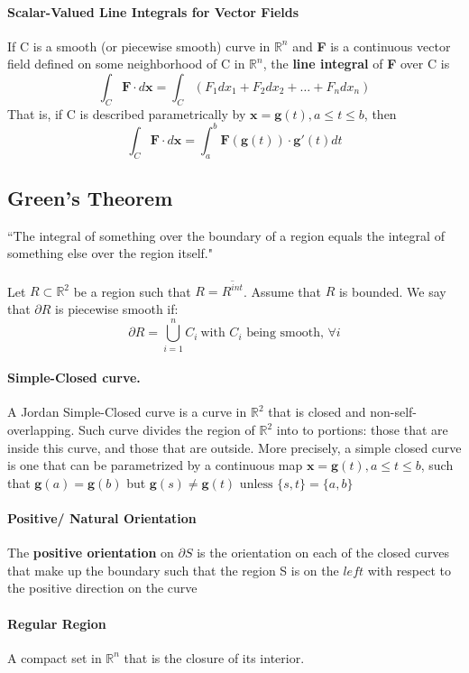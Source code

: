 \documentclass[11pt]{article}
\newcommand{\tb}[1]{\textbf{#1}}
\newcommand{\real}[0]{\mathbb{R}}
\newcommand{\vx}[0]{\tb{x}}
\begin{document}
\paragraph{Scalar-Valued Line Integrals for Vector Fields} If C is a smooth (or piecewise smooth) curve in $\real^n$ and \tb{F} is a continuous vector field defined on some neighborhood of C in $\real^n$, the \tb{line integral} of \tb{F} over C is
$$\int_C \tb{F} \cdot d\vx = \int_C (F_1dx_1+F_2dx_2+\hdots+F_ndx_n)$$
That is, if C is described parametrically by $\vx = \tb{g}(t), a\leq t\leq b$, then
$$\int_C \tb{F} \cdot d\vx = \int_a^b\tb{F}(\tb{g}(t))\cdot \tb{g}'(t)dt$$


\subsection{Green's Theorem} 
``The integral of something over the boundary of a region equals the integral of something else over the region itself."\\\\
Let $R\subset \real^2$ be a region such that $R = \overline{R^{int}}$. Assume that $R$ is bounded. We say that $\partial R$ is piecewise smooth if:
\begin{equation*}
    \partial R = \bigcup_{i = 1}^n C_i~\text{with $C_i$ being smooth, $\forall i$}
\end{equation*}

\paragraph{Simple-Closed curve.}
A Jordan Simple-Closed curve is a curve in $\real^2$ that is closed and non-self-overlapping. Such curve divides the region of $\real^2$ into to portions: those that are inside this curve, and those that are outside.
More precisely, a simple closed curve is one that can be parametrized by a continuous map $\vx = \tb{g}(t), a\leq t \leq b$, such that $\tb{g}(a) = \tb{g}(b)$ but $\tb{g}(s) \neq \tb{g}(t) \mbox{ unless } \{s,t\} = \{a, b\}$
\paragraph{Positive/ Natural Orientation} The \tb{positive orientation} on $\partial S$ is the orientation on each of the closed curves that make up the boundary such that the region S is on the $left$ with respect to the positive direction on the curve

\paragraph{Regular Region}
A compact set in $\real^n$ that is the closure of its interior.
\end{document}
